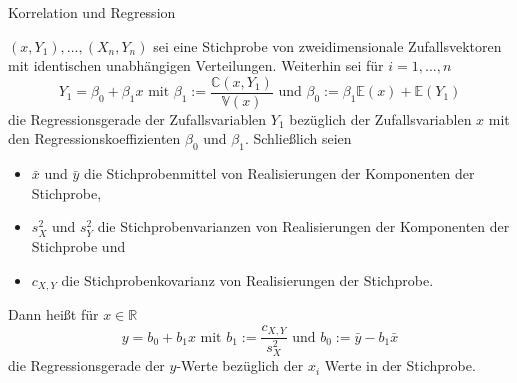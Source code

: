 \documentclass[
  8pt,
  ignorenonframetext,
]{beamer}
\begin{document}
\begin{frame}{Korrelation und Regression}
\protect\hypertarget{korrelation-und-regression-6}{}
\footnotesize
\begin{definition}[Stichprobenregressionsgerade]
\justifying
$(x,Y_1), ..., (X_n,Y_n)$ sei eine Stichprobe von zweidimensionale Zufallsvektoren
mit identischen unabhängigen Verteilungen. Weiterhin sei für $i = 1,...,n$
\begin{equation}
Y_1 = \beta_0 + \beta_1 x
\mbox{ mit }
\beta_1 := \frac{\mathbb{C}(x,Y_1)}{\mathbb{V}(x)}
\mbox{ und }
\beta_0 := \beta_1\mathbb{E}(x) + \mathbb{E}(Y_1)
\end{equation}
die Regressionsgerade der Zufallsvariablen $Y_1$ bezüglich der Zufallsvariablen
$x$ mit den Regressionskoeffizienten  $\beta_0$ und $\beta_1$. Schließlich seien
\begin{itemize}
\item $\bar{x}$  und $\bar{y}$ die Stichprobenmittel von Realisierungen der Komponenten der Stichprobe,
\item $s_X^2$ und $s_Y^2$ die Stichprobenvarianzen von Realisierungen der Komponenten der Stichprobe und
\item $c_{X,Y}$ die Stichprobenkovarianz  von Realisierungen der Stichprobe.
\end{itemize}
Dann heißt für $x \in \mathbb{R}$
\begin{equation}
y = b_0 + b_1 x
\mbox{ mit }
b_1 := \frac{c_{X,Y}}{s_X^2}
\mbox{ und }
b_0 := \bar{y} - b_1\bar{x}
\end{equation}
die Regressionsgerade der $y$-Werte bezüglich der $x_i$ Werte in der Stichprobe.
\end{definition}
\end{frame}
\end{document}
